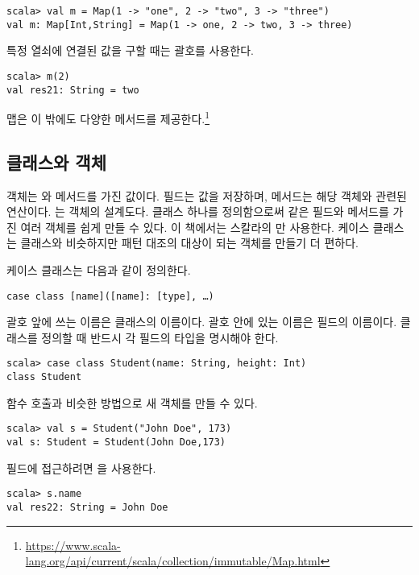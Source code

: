 \begin{verbatim}
scala> val m = Map(1 -> "one", 2 -> "two", 3 -> "three")
val m: Map[Int,String] = Map(1 -> one, 2 -> two, 3 -> three)
\end{verbatim}

특정 열쇠에 연결된 값을 구할 때는 괄호를 사용한다.

\begin{verbatim}
scala> m(2)
val res21: String = two
\end{verbatim}

맵은 이 밖에도 다양한 메서드를 제공한다.\footnote{\url{https://www.scala-lang.org/api/current/scala/collection/immutable/Map.html}}

\subsection{클래스와 객체}

객체는 와 메서드를 가진 값이다. 필드는 값을 저장하며, 메서드는 해당
객체와 관련된 연산이다. 는 객체의 설계도다. 클래스 하나를 정의함으로써
같은 필드와 메서드를 가진 여러 객체를 쉽게 만들 수 있다. 이 책에서는 스칼라의
만 사용한다. 케이스 클래스는 클래스와 비슷하지만
패턴 대조의 대상이 되는 객체를 만들기 더 편하다.

케이스 클래스는 다음과 같이 정의한다.

\begin{verbatim}
case class [name]([name]: [type], …)
\end{verbatim}

괄호 앞에 쓰는 이름은 클래스의 이름이다. 괄호 안에 있는 이름은 필드의 이름이다.
클래스를 정의할 때 반드시 각 필드의 타입을 명시해야 한다.

\begin{verbatim}
scala> case class Student(name: String, height: Int)
class Student
\end{verbatim}

함수 호출과 비슷한 방법으로 새 객체를 만들 수 있다.

\begin{verbatim}
scala> val s = Student("John Doe", 173)
val s: Student = Student(John Doe,173)
\end{verbatim}

필드에 접근하려면 을 사용한다.

\begin{verbatim}
scala> s.name
val res22: String = John Doe
\end{verbatim}

